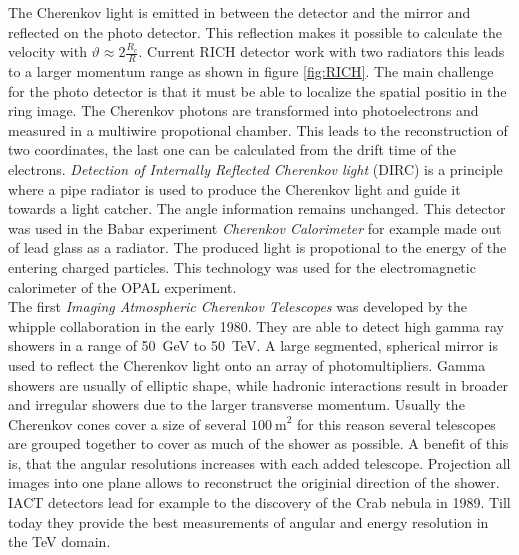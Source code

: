 The Cherenkov light is emitted in between the detector and the mirror and reflected on the photo detector. This reflection makes it possible to calculate the velocity with $\vartheta \approx 2\frac{R_c}{R}$. Current RICH detector work with two radiators this leads to a larger momentum range as shown in figure \ref{fig:RICH}.
The main challenge for the photo detector is that it must be able to localize the spatial positio in the ring image. The Cherenkov photons are transformed into photoelectrons and measured in a multiwire propotional chamber. This leads to the reconstruction of two coordinates, the last one can be calculated from the drift time of the electrons. \textit{Detection of Internally Reflected Cherenkov light} (DIRC) is a principle where a pipe radiator is used to produce the Cherenkov light and guide it towards a light catcher. The angle information remains unchanged. This detector was used in the Babar experiment \textit{Cherenkov Calorimeter} for example made out of lead glass as a radiator. The produced light is propotional to the energy of the entering charged particles. This technology was used for the electromagnetic calorimeter of the OPAL experiment.\\
The first \textit{Imaging Atmospheric Cherenkov Telescopes}  was developed by the whipple collaboration in the early 1980. They are able to detect high gamma ray showers in a range of \SI{50}{\giga\electronvolt} to \SI{50}{\tera\electronvolt}. A large segmented, spherical mirror is used to reflect the Cherenkov light onto an array of photomultipliers. Gamma showers are usually of elliptic shape, while hadronic interactions result in broader and irregular showers due to the larger transverse momentum. Usually the Cherenkov cones cover a size of several $\SI{100}{\meter}^2$ for this reason several telescopes are grouped together to cover as much of the shower as possible. A benefit of this is, that the angular resolutions increases with each added telescope. Projection all images into one plane allows to reconstruct the originial direction of the shower. IACT detectors lead for example to the discovery of the Crab nebula in 1989. Till today they provide the best measurements of angular and energy resolution in the \si{\tera\electronvolt} domain.\\
